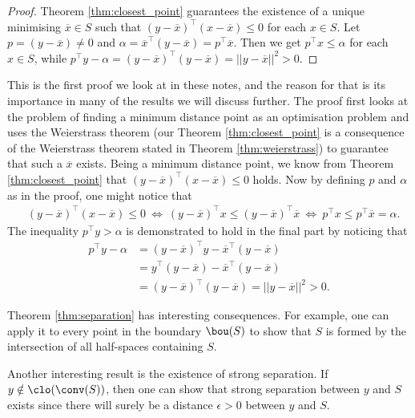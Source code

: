 %
\begin{proof}
	Theorem \ref{thm:closest_point} guarantees the existence of a unique minimising $\overline{x} \in S$ such that $(y-\overline{x})^\top(x - \overline{x}) \leq 0$ for each $x \in S$. Let $p = (y - \overline{x}) \neq 0$ and $\alpha = \overline{x}^\top(y - \overline{x}) = p^\top\overline{x}$. Then we get $p^\top x \leq \alpha$ for each $x \in S$, while $p^\top y - \alpha = (y - \overline{x})^\top(y - \overline{x}) = ||y - \overline{x}||^2 > 0$.
\end{proof}

This is the first proof we look at in these notes, and the reason for that is its importance in many of the results we will discuss further. The proof first looks at the problem of finding a minimum distance point as an optimisation problem and uses the Weierstrass theorem (our Theorem \ref{thm:closest_point} is a consequence of the Weierstrass theorem stated in Theorem \ref{thm:weierstrass}) to guarantee that such a $\overline{x}$ exists. Being a minimum distance point, we know from Theorem \ref{thm:closest_point} that $(y-\overline{x})^\top(x - \overline{x}) \leq 0$ holds. Now by defining $p$ and $\alpha$ as in the proof, one might notice that
%
\begin{align*}
	& (y-\overline{x})^\top(x - \overline{x}) \leq 0 \ \Leftrightarrow \ 
	(y-\overline{x})^\top x \leq (y - \overline{x})^\top\overline{x} \ \Leftrightarrow \ 
	p^\top x \leq p^\top\overline{x} = \alpha. 
\end{align*}
%
The inequality $p^\top y > \alpha$ is demonstrated to hold in the final part by noticing that 
%
\begin{align*}
	p^\top y - \alpha &= 
	(y - \overline{x})^\top y - \overline{x}^\top(y - \overline{x}) \\ &= 
	y^\top(y - \overline{x}) - \overline{x}^\top(y - \overline{x}) \\ & = (y - \overline{x})^\top (y - \overline{x}) = || y - \overline{x} ||^2 > 0.
\end{align*}

Theorem \ref{thm:separation} has interesting consequences. For example, one can apply it to every point in the boundary $\bou(S)$ to show that $S$ is formed by the intersection of all half-spaces containing $S$. 

Another interesting result is the existence of strong separation. If $y \notin \clo(\conv(S))$, then one can show that strong separation between $y$ and $S$ exists since there will surely be a distance $\epsilon>0$ between $y$ and $S$. 


